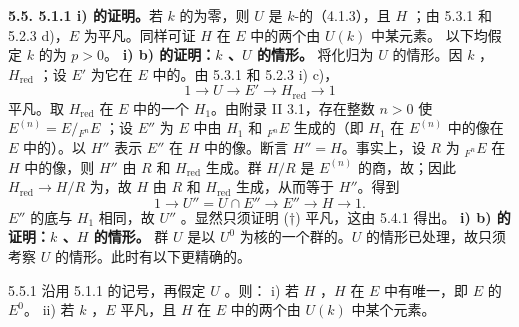 \textbf{5.5. 5.1.1 i) 的证明。}若 $k$ 的为零，则 $U$ 是 $k$-的（4.1.3），且 $H$ ；由 5.3.1 和 5.2.3 d)，$E$ 为平凡。同样可证 $H$ 在 $E$ 中的两个由 $U(k)$ 中某元素。
以下均假定 $k$ 的为 $p>0$。
\textbf{i) b) 的证明：$k$ 、$U$ 的情形。}
将化归为 $U$ 的情形。因 $k$ ，$H_{\mathrm{red}}$ ；设 $E'$ 为它在 $E$ 中的。由 5.3.1 和 5.2.3 i) c)，
\[1\longrightarrow U\longrightarrow E'\longrightarrow H_{\mathrm{red}}\longrightarrow1\]
平凡。取 $H_{\mathrm{red}}$ 在 $E$ 中的一个 $H_1$。由附录 II 3.1，存在整数 $n>0$ 使 $E^{(n)}=E/{}_{F^n}E$ ；设 $E''$ 为 $E$ 中由 $H_1$ 和 ${}_{F^n}E$ 生成的（即 $H_1$ 在 $E^{(n)}$ 中的像在 $E$ 中的）。以 $H''$ 表示 $E''$ 在 $H$ 中的像。断言 $H''=H$。事实上，设 $R$ 为 ${}_{F^n}E$ 在 $H$ 中的像，则 $H''$ 由 $R$ 和 $H_{\mathrm{red}}$ 生成。群 $H/R$ 是 $E^{(n)}$ 的商，故；因此 $H_{\mathrm{red}}\to H/R$ 为，故 $H$ 由 $R$ 和 $H_{\mathrm{red}}$ 生成，从而等于 $H''$。得到
\[1\longrightarrow U''=U\cap E''\longrightarrow E''\longrightarrow H\longrightarrow1.\tag{$\dagger$}\]
$E''$ 的底与 $H_1$ 相同，故 $U''$ 。显然只须证明 ($\dagger$) 平凡，这由 5.4.1 得出。
\textbf{i) b) 的证明：$k$ 、$H$ 的情形。}
群 $U$ 是以 $U^0$ 为核的一个群的。$U$ 的情形已处理，故只须考察 $U$ 的情形。此时有以下更精确的。
\begin{SGAresult}{}{5.5.1}
沿用 5.1.1 的记号，再假定 $U$ 。则：
i) 若 $H$ ，$H$ 在 $E$ 中有唯一，即 $E$ 的 $E^0$。
ii) 若 $k$ ，$E$ 平凡，且 $H$ 在 $E$ 中的两个由 $U(k)$ 中某个元素。
\end{SGAresult}
